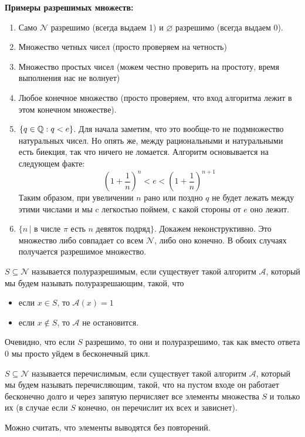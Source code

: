 \textbf{Примеры разрешимых множеств:} \begin{enumerate}
    \item Само $\mathcal{N}$ разрешимо (всегда выдаем 1) и $\varnothing$ разрешимо (всегда выдаем 0).
    \item Множество четных чисел (просто проверяем на четность)
    \item Множество простых чисел (можем честно проверить на простоту, время выполнения нас не волнует)
    \item Любое конечное множество (просто проверяем, что вход алгоритма лежит в этом конечном множестве).
    \item $\{ q \in \mathbb{Q} : q < e \}$. Для начала заметим, что это вообще-то не подмножество натуральных чисел. Но опять же, между рациональными и натуральными есть биекция, так что ничего не ломается. Алгоритм основывается на следующем факте: \[ \left(1 + \frac{1}{n} \right)^n < e < \left(1 + \frac{1}{n} \right)^{n+1} \]
    Таким образом, при увеличении $n$ рано или поздно $q$ не будет лежать между этими числами и мы c легкостью поймем, с какой стороны от $e$ оно лежит.
    \item $\{ n \, | \text{ в числе $\pi$ есть $n$ девяток подряд} \}$. Докажем неконструктивно. Это множество либо совпадает со всем $\mathcal{N}$, либо оно конечно. В обоих случаях получается разрешимое множество.
\end{enumerate}

\begin{conj}
    $S \subseteq \mathcal{N}$ называется полуразрешимым, если существует такой алгоритм $\mathcal{A}$, который мы будем называть полуразрешающим, такой, что \begin{itemize}
        \item если $x \in S$, то $\mathcal{A}(x) = 1$
        \item если $x \notin S$, то $\mathcal{A}$ не остановится.
    \end{itemize}
\end{conj}

Очевидно, что если $S$ разрешимо, то они и полуразрешимо, так как вместо ответа 0 мы просто уйдем в бесконечный цикл.

\begin{conj}
    $S \subseteq \mathcal{N}$ называется перечислимым, если существует такой алгоритм $\mathcal{A}$, который мы будем называть перечисляющим, такой, что на пустом входе он работает бесконечно долго и через запятую перчисляет все элементы множества $S$ и только их (в случае если $S$ конечно, он перечислит их всех и зависнет). 
\end{conj}
\begin{notice}
    Можно считать, что элементы выводятся без повторений.
\end{notice}

